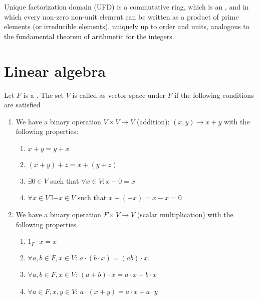 \begin{definition}
   Unique factorization domain (UFD) is a commutative ring, which is
   an , and in which every non-zero non-unit element
   can be written as a product of prime elements (or irreducible
   elements), uniquely up to order and units, analogous to the
   fundamental theorem of arithmetic for the integers. 
  \label{def:ufd}
\end{definition}

\section{Linear algebra}

\begin{definition}
  Let $F$ is a . The set $V$ is called as vector
  space under $F$ if the following conditions are satisfied
  \begin{enumerate}
  \item We have a binary operation $V \times V \rightarrow V$
    (addition): $(x,y) \rightarrow x + y$ with the following
    properties:
    \begin{enumerate}
    \item $x + y = y + x$
    \item $(x + y) + z = x + ( y + z )$
    \item $\exists 0 \in V$ such that $\forall x \in V: x + 0 = x$
    \item $\forall x \in V \exists -x \in V$ such that $x + (-x) = x -
      x = 0$ 
    \end{enumerate}    
  \item We have a binary operation $F \times V \rightarrow V$ (scalar
    multiplication) with the following properties
    \begin{enumerate}
    \item $1_F \cdot x = x$
    \item $\forall a,b \in F, x \in V$: $a\cdot\left(b \cdot x\right)
      = \left(a b\right) \cdot x$.
    \item $\forall a,b \in F, x \in V$:
      $(a+b)\cdot x = a \cdot x + b \cdot x$
    \item $\forall a \in F, x, y \in V$:
      $a\cdot(x+y) = a\cdot x + a \cdot y$
    \end{enumerate}        
  \end{enumerate}
  \label{def:vectorspace}
\end{definition}

